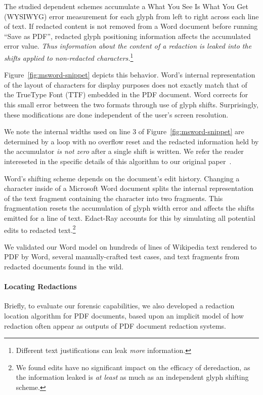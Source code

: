 The studied dependent schemes accumulate a What You See Is What You Get (WYSIWYG) error measurement for each glyph from left to right across each line of text.
If redacted content is not removed from a Word document before running ``Save as PDF'', redacted glyph positioning information affects the accumulated error value.
\emph{Thus information about the content of a redaction is leaked into the shifts applied to non-redacted characters.}\footnote{Different text justifications can leak \emph{more} information.}

Figure~\ref{fig:msword-snippet} depicts this behavior.
Word's internal representation of the layout of characters for display purposes does not exactly match that of the TrueType Font (TTF) embedded in the PDF document.
Word corrects for this small error between the two formats through use of glyph shifts.
Surprisingly, these modifications are done independent of the user's screen resolution.

We note the internal widths used on line 3 of Figure~\ref{fig:msword-snippet} are determined by a loop with no overflow reset and the redacted information held by the accumulator \emph{is not zero} after a single shift is written.
We refer the reader intereseted in the specific details of this algorithm to our original paper~\cite{bland2023story}.

Word's shifting scheme depends on the document's edit history. 
Changing a character inside of a Microsoft Word document splits the internal representation of the text fragment containing the character into two fragments. 
This fragmentation resets the accumulation of glyph width error and affects the shifts emitted for a line of text. 
Edact-Ray accounts for this by simulating all potential edits to redacted text.\footnote{
    We found edits have no significant impact on the efficacy of deredaction, as the information leaked is \emph{at least} as much as an independent glyph shifting scheme.
    }

We validated our Word model on hundreds of lines of Wikipedia text rendered to PDF by Word, several manually-crafted test cases, and text fragments from redacted documents found in the wild.



\paragraph{Locating Redactions}
Briefly, to evaluate our forensic capabilities, we also developed a redaction location algorithm for PDF documents, based upon an implicit model of how redaction often appear as outputs of PDF document redaction systems.

